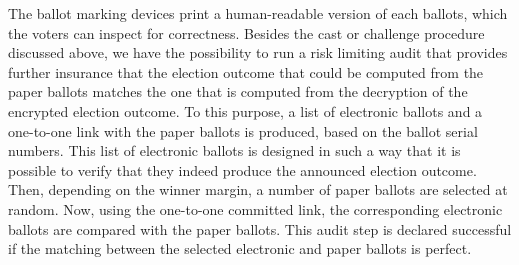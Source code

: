 The ballot marking devices print a human-readable version of each
ballots, which the voters can inspect for correctness. Besides the
cast or challenge procedure discussed above, we have the possibility
to run a risk limiting audit that provides further insurance that the
election outcome that could be computed from the paper ballots matches
the one that is computed from the decryption of the encrypted election
outcome. To this purpose, a list of electronic ballots and a
one-to-one link with the paper ballots is produced, based on the
ballot serial numbers. This list of electronic ballots is designed in
such a way that it is possible to verify that they indeed produce the
announced election outcome. Then, depending on the winner margin, a
number of paper ballots are selected at random. Now, using the
one-to-one committed link, the corresponding electronic ballots are
compared with the paper ballots. This audit step is declared
successful if the matching between the selected electronic and paper
ballots is perfect.

